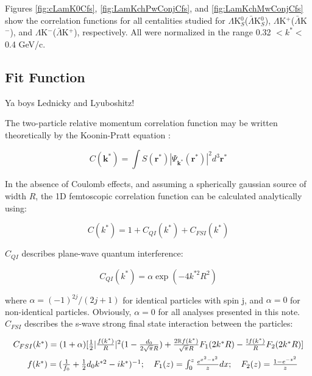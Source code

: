 \documentclass[ALICE,manyauthors]{cernphprep}
\begin{document}
Figures \ref{fig:cLamK0Cfs}, \ref{fig:LamKchPwConjCfs}, and \ref{fig:LamKchMwConjCfs} show the correlation functions for all centalities studied for $\Lambda$K$^{0}_{S}$($\bar{\Lambda}$K$^{0}_{S}$), $\Lambda$K$^{+}$($\bar{\Lambda}$K$^{-}$), and $\Lambda$K$^{-}$($\bar{\Lambda}$K$^{+}$), respectively. All were normalized in the range 0.32 $< k^{*} < $ 0.4 GeV/c.


\subsection{Fit Function}
\label{sec:FitFunction}
Ya boys Lednicky and Lyuboshitz!

The two-particle relative momentum correlation function may be written theoretically by the Koonin-Pratt equation \cite{Koonin:1977fh, Pratt:1990zq}:

\begin{equation}
 C(\mathbf{k^{*}}) = \int S(\mathbf{r^{*}})|\Psi_{\mathbf{k^{*}}}(\mathbf{r^{*}})|^{2}d^{3}\mathbf{r^{*}}
\label{eqn:KooninPrattEqn}
\end{equation}

In the absence of Coulomb effects, and assuming a spherically gaussian source of width $R$, the 1D femtoscopic correlation function can be calculated analytically using:

\begin{equation}
 C(k^{*}) = 1 + C_{QI}(k^{*}) + C_{FSI}(k^{*})
\label{eqn:LednickyEqn}
\end{equation}

$C_{QI}$ describes plane-wave quantum interference:

\begin{equation}
 C_{QI}(k^{*}) = \alpha\exp(-4k^{*2}R^{2})
\label{eqn:CQI}
\end{equation}

where $\alpha = (-1)^{2j}/(2j+1)$ for identical particles with spin j, and $\alpha = 0$ for non-identical particles.  Obviously, $\alpha = 0$ for all analyses presented in this note.  $C_{FSI}$ describes the s-wave strong final state interaction between the particles:

\begin{equation}
\begin{array}{l}
\vspace{2mm}  %
  C_{FSI}(k^{*}) = (1+\alpha)[\frac{1}{2}|\frac{f(k^{*})}{R}|^2(1-\frac{d_{0}}{2\sqrt{\pi}R})+\frac{2\mathbb{R}f(k^{*})}{\sqrt{\pi}R}F_{1}(2k^{*}R)-\frac{\mathbb{I}f(k^{*})}{R}F_{2}(2k^{*}R)] \\
\vspace{2mm}  %
  ~~~~~f(k^{*}) = (\frac{1}{f_{0}}+\frac{1}{2}d_{0}k^{*2}-ik^{*})^{-1};~~~
  F_{1}(z) = \int_{0}^{z} \frac{e^{x^{2}-z^{2}}}{z}dx;~~~
  F_{2}(z) = \frac{1-e^{-z^{2}}}{z}
\end{array}  
\label{eqn:CFSI}
\end{equation}
\end{document}
